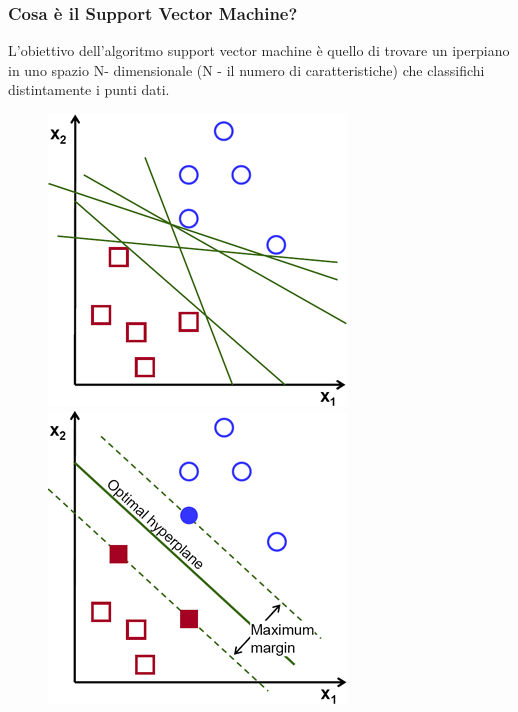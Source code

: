 \subsubsection{Cosa è il Support Vector Machine?}
L'obiettivo dell'algoritmo support vector machine è quello di trovare un iperpiano in uno spazio N- dimensionale (N - il numero di caratteristiche) che classifichi distintamente i punti dati.
\begin{figure}[h]
  \begin{minipage}[b]{0.45\linewidth}
    \centering
    \includegraphics[width=\linewidth]{images/image25.png}
  \end{minipage}
  \begin{minipage}[b]{0.45\linewidth}
    \centering
    \includegraphics[width=\linewidth]{images/image26.png}
  \end{minipage}
\end{figure}
